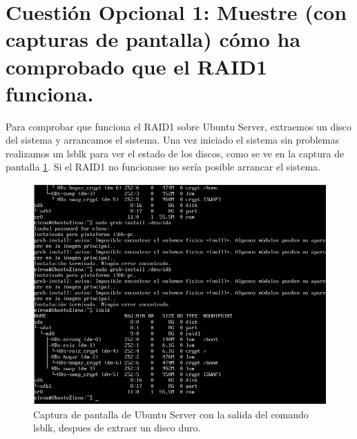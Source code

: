 
\section{Cuestión Opcional 1: Muestre (con capturas de pantalla) cómo ha comprobado que el RAID1 funciona.}
Para comprobar que funciona el RAID1 sobre Ubuntu Server, extraemos un disco del sistema y arrancamos el sistema.
Una vez iniciado el sistema sin problemas realizamos un lsblk para ver el estado de los discos, como se ve en la captura de pantalla \ref{fig:figura2}.
Si el RAID1 no funcionase no sería posible arrancar el sistema.
\begin{figure}[H] %
\centering
\includegraphics[scale=0.4]{img/P1-ubuntu-despuesdearrancarSinDisco.png} 
\caption{Captura de pantalla de Ubuntu Server con la salida del comando lsblk, despues de extraer un disco duro.} \label{fig:figura2}
\end{figure}

